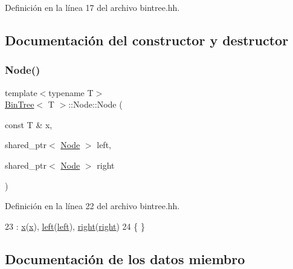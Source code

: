 Definición en la línea 17 del archivo bintree.\+hh.



\subsection{Documentación del constructor y destructor}
\mbox{\label{struct_bin_tree_1_1_node_af45885e303875c018e89fa5c8b96bde0}} 
\subsubsection{\texorpdfstring{Node()}{Node()}}
{\footnotesize\ttfamily template$<$typename T$>$ \\
\mbox{\hyperlink{class_bin_tree}{Bin\+Tree}}$<$ T $>$\+::Node\+::\+Node (\begin{DoxyParamCaption}\item[{const T \&}]{x,  }\item[{shared\+\_\+ptr$<$ \mbox{\hyperlink{struct_bin_tree_1_1_node}{Node}} $>$}]{left,  }\item[{shared\+\_\+ptr$<$ \mbox{\hyperlink{struct_bin_tree_1_1_node}{Node}} $>$}]{right }\end{DoxyParamCaption})}



Definición en la línea 22 del archivo bintree.\+hh.


\begin{DoxyCode}
23         :   \mbox{\hyperlink{struct_bin_tree_1_1_node_a9c268d4af01559e8237dbeb5bd19af91}{x}}(\mbox{\hyperlink{struct_bin_tree_1_1_node_a9c268d4af01559e8237dbeb5bd19af91}{x}}), \mbox{\hyperlink{struct_bin_tree_1_1_node_a265a6367635a38838e6a6366564be78d}{left}}(\mbox{\hyperlink{struct_bin_tree_1_1_node_a265a6367635a38838e6a6366564be78d}{left}}), \mbox{\hyperlink{struct_bin_tree_1_1_node_a6df770137090da60cd0376ce06893cbd}{right}}(\mbox{\hyperlink{struct_bin_tree_1_1_node_a6df770137090da60cd0376ce06893cbd}{right}})
24         \{   \}
\end{DoxyCode}


\subsection{Documentación de los datos miembro}
\mbox{\label{struct_bin_tree_1_1_node_a9c268d4af01559e8237dbeb5bd19af91}} 
